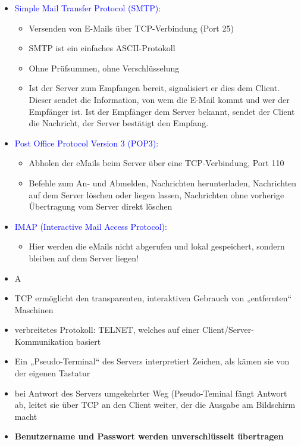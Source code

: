 \begin{itemize}
    \item \textcolor{blue}{Simple Mail Transfer Protocol (SMTP):}
    \begin{itemize}
        \item Versenden von E-Mails über TCP-Verbindung (Port 25)
        \item SMTP ist ein einfaches ASCII-Protokoll
        \item Ohne Prüfsummen, ohne Verschlüsselung
        \item Ist der Server zum Empfangen bereit, signalisiert er dies dem Client.
        Dieser sendet die Information, von wem die E-Mail kommt und wer der Empfänger ist.
        Ist der Empfänger dem Server bekannt, sendet der Client die Nachricht, der Server bestätigt den Empfang.
    \end{itemize}
    \item \textcolor{blue}{Post Office Protocol Version 3 (POP3):}
    \begin{itemize}
        \item Abholen der eMails beim Server über eine TCP-Verbindung, Port 110
        \item Befehle zum An- und Abmelden, Nachrichten herunterladen, Nachrichten auf dem Server löschen oder liegen lassen, Nachrichten ohne vorherige Übertragung vom Server direkt löschen
    \end{itemize}
    \item \textcolor{blue}{IMAP (Interactive Mail Access Protocol):}
    \begin{itemize}
        \item Hier werden die eMails nicht abgerufen und lokal gespeichert, sondern bleiben auf dem Server liegen!
    \end{itemize}
\end{itemize}

\begin{itemize}
    \item \todo A
\end{itemize}

\begin{itemize}
    \item TCP ermöglicht den transparenten, interaktiven Gebrauch von „entfernten“ Maschinen
    \item verbreitetes Protokoll: TELNET, welches auf einer Client/Server-Kommunikation basiert
    \item Ein „Pseudo-Terminal“ des Servers interpretiert Zeichen, als kämen sie von der eigenen Tastatur
    \item bei Antwort des Servers umgekehrter Weg (Pseudo-Teminal fängt Antwort ab, leitet sie über TCP an den Client weiter, der die Ausgabe am Bildschirm macht
    \item \textbf{Benutzername und Passwort werden unverschlüsselt übertragen}
\end{itemize}

